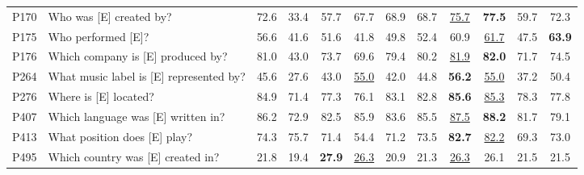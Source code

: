 \documentclass[letterpaper]{article} %
\begin{document}
\begin{table}
{\begin{tabular}{llcccccccccc}
			P170                                                  & Who was [E] created by?                 & 72.6             & 33.4            & 57.7               & 67.7             & 68.9                         & 68.7                        & \underline{75.7}   & \textbf{77.5}     & 59.7                & 72.3                     \\
			P175                                                  & Who performed [E]?                      & 56.6             & 41.6            & 51.6               & 41.8             & 49.8                         & 52.4                        & 60.9               & \underline{	61.7 	} & 47.5                & \textbf{63.9}            \\
			P176                                                  & Which company is [E] produced by?       & 81.0             & 43.0            & 73.7               & 69.6             & 79.4                         & 80.2                        & \underline{81.9}   & \textbf{82.0}     & 71.7                & 74.5                     \\
			P264                                                  & What music label is [E] represented by? & 45.6             & 27.6            & 43.0               & \underline{55.0} & 42.0                         & 44.8                        & \textbf{56.2}      & \underline{55.0}  & 37.2                & 50.4                     \\
			P276                                                  & Where is [E] located?                   & 84.9             & 71.4            & 77.3               & 76.1             & 83.1                         & 82.8                        & \textbf{85.6}      & \underline{85.3}  & 78.3                & 77.8                     \\
			P407                                                  & Which language was [E] written in?      & 86.2             & 72.9            & 82.5               & 85.9             & 83.6                         & 85.5                        & \underline{87.5}   & \textbf{88.2}     & 81.7                & 79.1                     \\
			P413                                                  & What position does [E] play?            & 74.3             & 75.7            & 71.4               & 54.4             & 71.2                         & 73.5                        & \textbf{82.7}      & \underline{82.2}  & 69.3                & 73.0                     \\
			P495                                                  & Which country was [E] created in?       & 21.8             & 19.4            & \textbf{27.9}      & \underline{26.3} & 20.9                         & 21.3                        & \underline{26.3}   & 26.1              & 21.5                & 21.5                     \\

\end{tabular}}
\end{table}
\end{document}

